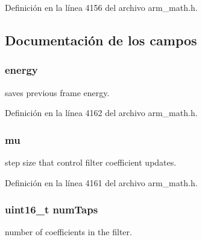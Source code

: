 Definición en la línea 4156 del archivo arm\+\_\+math.\+h.



\subsection{Documentación de los campos}
\subsubsection[{\texorpdfstring{energy}{energy}}]{ energy}\hypertarget{structarm__lms__norm__instance__f32_ae1ed544b72f1510ed55d144a9424fddd}{}\label{structarm__lms__norm__instance__f32_ae1ed544b72f1510ed55d144a9424fddd}
saves previous frame energy. 

Definición en la línea 4162 del archivo arm\+\_\+math.\+h.

\subsubsection[{\texorpdfstring{mu}{mu}}]{ mu}\hypertarget{structarm__lms__norm__instance__f32_a11402afa7c9b9dac4cb953fa386e74d2}{}\label{structarm__lms__norm__instance__f32_a11402afa7c9b9dac4cb953fa386e74d2}
step size that control filter coefficient updates. 

Definición en la línea 4161 del archivo arm\+\_\+math.\+h.

\subsubsection[{\texorpdfstring{num\+Taps}{numTaps}}]{\setlength{\rightskip}{0pt plus 5cm}uint16\+\_\+t num\+Taps}\hypertarget{structarm__lms__norm__instance__f32_a751941891e47f522a7f5375fe8990aac}{}\label{structarm__lms__norm__instance__f32_a751941891e47f522a7f5375fe8990aac}
number of coefficients in the filter. 

